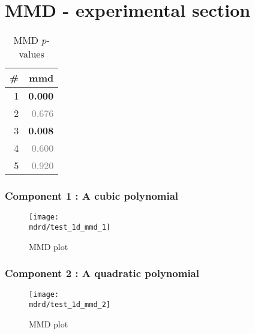 \documentclass{article} %
\begin{document}
\section{MMD - experimental section}
\label{sec:mmd}

\begin{table}[htb]
\begin{center}
{\small
\begin{tabular}{|r|r|}
\hline
\bf{\#} & {mmd}\\
\hline

1 & \textbf{0.000}\\

2 & \textcolor{gray}{0.676}\\

3 & \textbf{0.008}\\

4 & \textcolor{gray}{0.600}\\

5 & \textcolor{gray}{0.920}\\

\hline
\end{tabular}
\caption{
MMD $p$-values
}
\label{table:mmd}
}
\end{center}
\end{table}

\subsubsection{Component 1 : A cubic polynomial}

\begin{figure}[H]
\newcommand{\wmgd}{0.5\columnwidth}
\newcommand{\hmgd}{3.0cm}
\newcommand{\mdrd}{test_1d}
\newcommand{\mbm}{\hspace{-0.3cm}}
\texttt{[image: \\mdrd/test\_1d\_mmd\_1]}
\caption{
MMD plot}
\label{fig:mmd1}
\end{figure}

\subsubsection{Component 2 : A quadratic polynomial}

\begin{figure}[H]
\newcommand{\wmgd}{0.5\columnwidth}
\newcommand{\hmgd}{3.0cm}
\newcommand{\mdrd}{test_1d}
\newcommand{\mbm}{\hspace{-0.3cm}}
\texttt{[image: \\mdrd/test\_1d\_mmd\_2]}
\caption{
MMD plot}
\label{fig:mmd2}
\end{figure}
\end{document}
